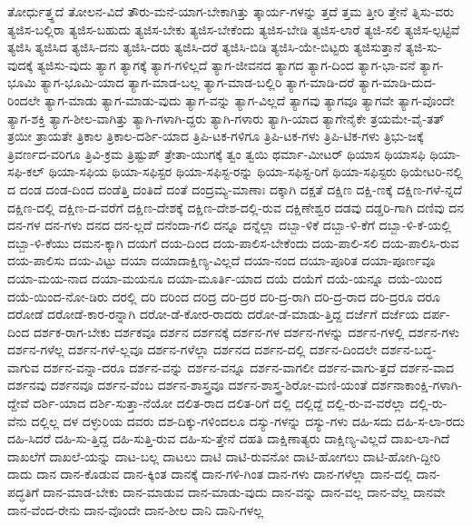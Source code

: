 {ತೋರ್ಧುತ್ತ್ಧದೆ
ತೋಲನ-ವಿದೆ
ತೌರು-ಮನೆ-ಯಾಗ-ಬೇಕಾಗಿತ್ತು
ತ್ಕಾರ್ಯ-ಗಳನ್ನು
ತ್ತದೆ
ತ್ತಮ
ತ್ತೀರಿ
ತ್ತೇನೆ
ತ್ನಿಸು-ವರು
ತ್ಯಜಿಸ-ಬಲ್ಲಿರಾ
ತ್ಯಜಿಸ-ಬಹುದು
ತ್ಯಜಿಸ-ಬೇಕು
ತ್ಯಜಿಸ-ಬೇಕೆಂದು
ತ್ಯಜಿಸ-ಬೇಡಿ
ತ್ಯಜಿಸ-ಲಾರೆ
ತ್ಯಜಿ-ಸಲಿ
ತ್ಯಜಿಸ-ಲ್ಪಟ್ಟಿವೆ
ತ್ಯಜಿಸಿ
ತ್ಯಜಿಸಿದ
ತ್ಯಜಿಸಿ-ದನು
ತ್ಯಜಿಸಿ-ದರು
ತ್ಯಜಿಸಿ-ದರೆ
ತ್ಯಜಿಸಿ-ಬಿಡಿ
ತ್ಯಜಿಸಿ-ಯೇ-ಬಿಟ್ಟರು
ತ್ಯಜಿಸುತ್ತಾನೆ
ತ್ಯಜಿ-ಸು-ವುದಕ್ಕೆ
ತ್ಯಜಿಸು-ವುದು
ತ್ಯಾಗ
ತ್ಯಾಗಕ್ಕೆ
ತ್ಯಾಗ-ಗಳಿಲ್ಲದೆ
ತ್ಯಾಗ-ಜೀವನದ
ತ್ಯಾಗದ
ತ್ಯಾಗ-ದಿಂದ
ತ್ಯಾಗ-ಭಾ-ವನೆ
ತ್ಯಾಗ-ಭೂಮಿ
ತ್ಯಾಗ-ಭೂಮಿ-ಯಾದ
ತ್ಯಾಗ-ಮಾಡ-ಬಲ್ಲ
ತ್ಯಾಗ-ಮಾಡ-ಬಲ್ಲಿರಿ
ತ್ಯಾಗ-ಮಾಡಿ-ದರೆ
ತ್ಯಾಗ-ಮಾಡಿ-ದುದ-ರಿಂದಲೇ
ತ್ಯಾಗ-ಮಾಡು
ತ್ಯಾಗ-ಮಾಡು-ವುದು
ತ್ಯಾಗ-ವನ್ನು
ತ್ಯಾಗ-ವಿಲ್ಲದೆ
ತ್ಯಾಗವು
ತ್ಯಾಗವೂ
ತ್ಯಾಗವೇ
ತ್ಯಾಗ-ವೊಂದೇ
ತ್ಯಾಗ-ಶಕ್ತಿ
ತ್ಯಾಗ-ಶೀಲ-ವಾಗಿತ್ತು
ತ್ಯಾಗಿ-ಗಳಾಗಿ-ದ್ದರು
ತ್ಯಾಗಿ-ಗಳಾರು
ತ್ಯಾಗಿ-ಯಾದ
ತ್ಯಾಗೇನೈಕೇ
ತ್ರಯಮೇ-ವೈ-ತತ್
ತ್ರಯೀ
ತ್ರಾಯತೇ
ತ್ರಿಕಾಲ
ತ್ರಿಕಾಲ-ದರ್ಶಿ-ಯಾದ
ತ್ರಿಪಿ-ಟಕ-ಗಳಿಗೂ
ತ್ರಿಪಿ-ಟಕ-ಗಳು
ತ್ರಿಪಿ-ಟಿಕ-ಗಳು
ತ್ರಿಭು-ಜಕ್ಕೆ
ತ್ರಿವರ್ಣದ-ವರಿಗೂ
ತ್ರಿವಿ-ಕ್ರಮ
ತ್ರಿಷ್ಟುಪ್
ತ್ರೇತಾ-ಯುಗಕ್ಕೆ
ತ್ವಂ
ತ್ವಯಿ
ಥರ್ಮಾ-ಮೀಟರ್
ಥಿಯಾಸ
ಥಿಯಾಸಫಿ
ಥಿಯಾ-ಸಫಿ-ಕಲ್
ಥಿಯಾ-ಸಫಿಯ
ಥಿಯಾ-ಸಫಿಸ್ಟರ
ಥಿಯಾ-ಸಫಿಸ್ಟ-ರನ್ನು
ಥಿಯಾ-ಸಫಿಸ್ಟ-ರಿಗೆ
ಥಿಯಾ-ಸಫಿಸ್ಟರು
ಥಿಯೇಟರಿ-ನಲ್ಲಿ
ದ
ದಂಡ
ದಂಡ-ದಿಂದ
ದಂಡೆತ್ತಿ
ದಂತಿದೆ
ದಂತೆ
ದಂದ್ರಮ್ಯ-ಮಾಣಾಃ
ದಕ್ಕಾಗಿ
ದಕ್ಷತೆ
ದಕ್ಷಿಣ
ದಕ್ಷಿ-ಣಕ್ಕೆ
ದಕ್ಷಿಣ-ಗಳೆ-ನ್ನದೆ
ದಕ್ಷಿಣ-ದಲ್ಲಿ
ದಕ್ಷಿಣ-ದ-ವರೆಗೆ
ದಕ್ಷಿಣ-ದೇಶಕ್ಕೆ
ದಕ್ಷಿಣ-ದೇಶ-ದಲ್ಲಿ-ರುವ
ದಕ್ಷಿಣೇಶ್ವರ
ದಡವು
ದಡ್ಡರಿ-ಗಾಗಿ
ದಣಿವು
ದನ
ದನ-ಗಳ
ದನ-ಗಳು
ದನದ
ದನ-ಲ್ಲದೆ
ದನೆಂದಾ-ಗಲಿ
ದನ್ನೂ
ದನ್ನೆಲ್ಲಾ
ದಬ್ಬಾ-ಳಿಕೆ
ದಬ್ಬಾ-ಳಿ-ಕೆಗೆ
ದಬ್ಬಾ-ಳಿ-ಕೆ-ಯಲ್ಲಿ
ದಬ್ಬಾ-ಳಿ-ಕೆಯು
ದಮನ-ಕ್ಕಾಗಿ
ದಯಗೆ
ದಯ-ದಿಂದ
ದಯ-ಪಾಲಿಸ-ಬೇಕೆಂದು
ದಯ-ಪಾಲಿ-ಸಲಿ
ದಯ-ಪಾಲಿಸಿ-ರುವ
ದಯ-ಪಾಲಿಸು
ದಯ-ವಿಟ್ಟು
ದಯಾ
ದಯಾದಾಕ್ಷಿಣ್ಯ-ವಿಲ್ಲದೆ
ದಯಾ-ನಂದ
ದಯಾ-ಪೂರಿತ
ದಯಾ-ಪೂರ್ಣವೂ
ದಯಾ-ಮಯ-ನಾದ
ದಯಾ-ಮಯನೂ
ದಯಾ-ಮೂರ್ತಿ-ಯಾದ
ದಯೆ
ದಯೆಗೆ
ದಯೆ-ಯನ್ನೂ
ದಯೆ-ಯಿಂದ
ದಯೆ-ಯಿಂದ-ನೋ-ಡಿರು
ದರಲ್ಲಿ
ದರಿ
ದರಿಂದ
ದರಿದ್ರ
ದರಿ-ದ್ರರ
ದರಿ-ದ್ರ-ರಾಗಿ
ದರಿ-ದ್ರ-ರಾದ
ದರಿ-ದ್ರರೂ
ದರೂ
ದರೋಡೆ
ದರೋಡೆ-ಕಾರ-ರನ್ನಾಗಿ
ದರೋ-ಡೆ-ಕೋರ-ರಾದರು
ದರೋ-ಡೆ-ಮಾಡು-ತ್ತಿದ್ದ
ದರ್ಜೆಗೆ
ದರ್ಜೆಯ
ದರ್ಪ-ದಿಂದ
ದರ್ಶಕ-ರಾಗ-ಬೇಕು
ದರ್ಶಕವೂ
ದರ್ಶನ
ದರ್ಶನಕ್ಕೆ
ದರ್ಶನ-ಗಳ
ದರ್ಶನ-ಗಳನ್ನು
ದರ್ಶನ-ಗಳಲ್ಲಿ
ದರ್ಶನ-ಗಳು
ದರ್ಶನ-ಗಳೆಲ್ಲ
ದರ್ಶನ-ಗಳೆ-ಲ್ಲವೂ
ದರ್ಶನ-ಗಳೆಲ್ಲಾ
ದರ್ಶನದ
ದರ್ಶನ-ದಲ್ಲಿ
ದರ್ಶನ-ದಿಂದಲೇ
ದರ್ಶನ-ಬದ್ಧ-ವಾಗುವ
ದರ್ಶನ-ವನ್ನಾ-ದರೂ
ದರ್ಶನ-ವನ್ನು
ದರ್ಶನ-ವನ್ನೂ
ದರ್ಶನ-ವಾಗಲೀ
ದರ್ಶನ-ವಾಗು-ತ್ತದೆ
ದರ್ಶನ-ವಾದ
ದರ್ಶನವು
ದರ್ಶನವೂ
ದರ್ಶನ-ವೆಂಬ
ದರ್ಶನ-ಶಾಸ್ತ್ರವೂ
ದರ್ಶನ-ಶಾಸ್ತ್ರ-ಶಿರೋ-ಮಣಿ-ಯಂತೆ
ದರ್ಶನಾಕಾಂಕ್ಷಿ-ಗಳಾಗಿ-ದ್ದೇವೆ
ದರ್ಶಿ-ಯಾದ
ದರ್ಶಿ-ಸುತ್ತಾ-ನೆಯೋ
ದಲಿತ-ರಾದ
ದಲಿತ-ರಿಗೆ
ದಲ್ಲಿ
ದಲ್ಲಿದ್ದೆ
ದಲ್ಲಿ-ರು-ವ-ವರೆಲ್ಲಾ
ದಲ್ಲಿ-ರು-ವೆನು
ದಲ್ಲಿಲ್ಲ
ದಳ
ದಳ್ಳುರಿಯ
ದವರು
ದಶ-ದಿಕ್ಕು-ಗಳಿಂದಲೂ
ದಸ್ಯು-ಗಳನ್ನು
ದಸ್ಯು-ಗಳು
ದಹಿ-ಸದು
ದಹಿ-ಸ-ಲಾ-ರದು
ದಹಿ-ಸಿದರೆ
ದಹಿ-ಸು-ತ್ತಿದ್ದ
ದಹಿ-ಸುತ್ತಿ-ರುವ
ದಹಿ-ಸು-ತ್ತೇನೆ
ದಹತಿ
ದಾಕ್ಷಿಣಾತ್ಯರು
ದಾಕ್ಷಿಣ್ಯ-ವಿಲ್ಲದೆ
ದಾಖ-ಲಾ-ಗಿದೆ
ದಾಖಲೆಗೆ
ದಾಖಲೆ-ಯನ್ನು
ದಾಟ-ಬಲ್ಲ
ದಾಟಲು
ದಾಟಿ
ದಾಟಿ-ರುವನೋ
ದಾಟಿ-ಹೋಗಲು
ದಾಟಿ-ಹೋಗಿ-ದ್ದೀರಿ
ದಾದು
ದಾನ
ದಾನ-ಕೊಡುವ
ದಾನ-ಕ್ಕಿಂತ
ದಾನಕ್ಕೆ
ದಾನ-ಗಳಿ-ಗಿಂತ
ದಾನ-ಗಳು
ದಾನ-ಗಳೆಲ್ಲಾ
ದಾನ-ದಲ್ಲಿ
ದಾನ-ಪದ್ಧತಿಗೆ
ದಾನ-ಮಾಡ-ಬೇಕು
ದಾನ-ಮಾಡುವ
ದಾನ-ಮಾಡು-ವುದು
ದಾನ-ವನ್ನು
ದಾನ-ವಲ್ಲ
ದಾನ-ವೆಲ್ಲ
ದಾನವೇ
ದಾನ-ವೆಂದ-ರೇನು
ದಾನ-ವೊಂದೇ
ದಾನ-ಶೀಲ
ದಾನಿ
ದಾನಿ-ಗಳಲ್ಲ
}
